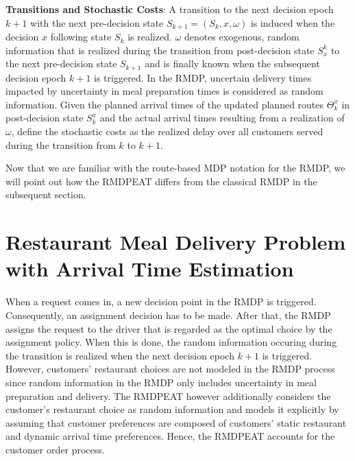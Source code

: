 \begin{description}[font=$\bullet$\scshape\bfseries]
	\item \textbf{Transitions and Stochastic Costs}: A transition to the next decision epoch $ k+1 $  with the next pre-decision state $ S_{k+1} = (S_k, x, \omega) $ is induced when the decision $ x $ following state $ S_k $ is realized. $ \omega $ denotes exogenous, random information that is realized during the transition from post-decision state $ S^{k}_x $ to the next pre-decision state $ S_{k+1} $ and is finally known when the subsequent decision epoch $ k+1 $ is triggered. In the RMDP, uncertain delivery times impacted by uncertainty in meal preparation times is considered as random information. Given the planned arrival times of the updated planned routes $ \Theta^{x}_k $ in post-decision state $ S^{x}_k $ and the actual arrival times resulting from a realization of $ \omega $, \cite{UlmerRMDP} define the stochastic costs as the realized delay over all customers served during the transition from $ k $ to $ k+1 $.
\end{description}

Now that we are familiar with the route-based MDP notation for the RMDP, we will point out how the RMDPEAT differs from the classical RMDP in the subsequent section. 
\section{Restaurant Meal Delivery Problem with Arrival Time Estimation}

When a request comes in, a new decision point in the RMDP is triggered. Consequently, an assignment decision has to be made. After that, the RMDP assigns the request to the driver that is regarded as the optimal choice by the assignment policy. When this is done, the random information occuring during the transition is realized when the next decision epoch $ k+1 $ is triggered. However, customers' restaurant choices are not modeled in the RMDP process since random information in the RMDP only includes uncertainty in meal preparation and delivery. The RMDPEAT however additionally considers the customer's restaurant choice as random information and models it explicitly by assuming that customer preferences are composed of customers' static restaurant and dynamic arrival time preferences. Hence, the RMDPEAT accounts for the customer order process. 


